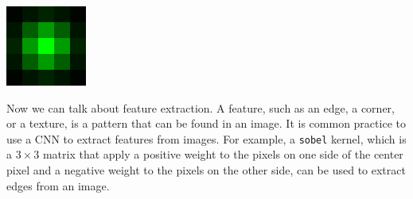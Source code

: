 \documentclass[a4paper,12pt]{article}
\begin{document}
\begin{minipage}{0.5\textwidth}
	\centering
	\includegraphics[width=0.5\linewidth]{./guassian kernel.png}
	\label{fig:gaussian blurred}
\end{minipage}
\begin{minipage}{0.5\textwidth}
	\centering
\end{minipage}

\vspace{1em}

Now we can talk about feature extraction.
A feature, such as an edge, a corner, or a texture, is a pattern that can be found in an image.
It is common practice to use a CNN to extract features from images.
For example, a \texttt{sobel} kernel, which is a $3 \times 3$ matrix that apply a positive weight to the pixels on one side of the center pixel and a negative weight to the pixels on the other side, can be used to extract edges from an image.
\end{document}
